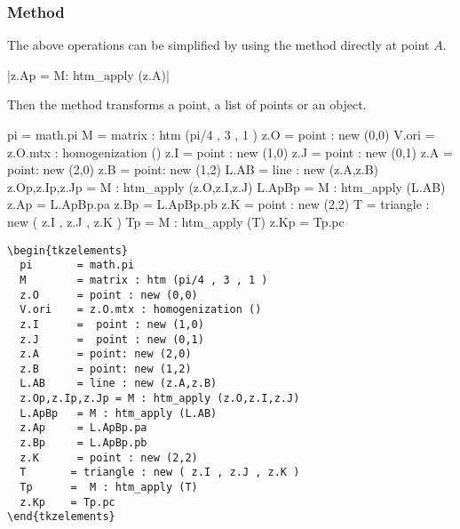 \subsubsection{Method } %
\label{ssub:method_code_htm__apply}
The above operations can be simplified by using the  method directly at point $A$. 

\begin{mybox}
|z.Ap = M: htm_apply (z.A)|\\
\end{mybox}

Then the method  transforms a point, a list of points or an object.

  \begin{tkzelements}
pi       = math.pi
M        = matrix : htm (pi/4 , 3 , 1 )
z.O      = point : new (0,0)
V.ori    = z.O.mtx : homogenization ()
z.I      =  point : new (1,0)
z.J      =  point : new (0,1)
z.A      = point: new (2,0)
z.B      = point: new (1,2)
L.AB     = line : new (z.A,z.B)
z.Op,z.Ip,z.Jp = M : htm_apply (z.O,z.I,z.J)
L.ApBp   = M : htm_apply (L.AB)
z.Ap     = L.ApBp.pa
z.Bp     = L.ApBp.pb
z.K      = point : new (2,2)
T       = triangle : new ( z.I , z.J , z.K )
Tp      =  M : htm_apply (T)
z.Kp    = Tp.pc
\end{tkzelements}

\begin{minipage}{.6\textwidth}
\begin{Verbatim}
\begin{tkzelements}
  pi       = math.pi
  M        = matrix : htm (pi/4 , 3 , 1 )
  z.O      = point : new (0,0)
  V.ori    = z.O.mtx : homogenization ()
  z.I      =  point : new (1,0)
  z.J      =  point : new (0,1)
  z.A      = point: new (2,0)
  z.B      = point: new (1,2)
  L.AB     = line : new (z.A,z.B)
  z.Op,z.Ip,z.Jp = M : htm_apply (z.O,z.I,z.J)
  L.ApBp   = M : htm_apply (L.AB)
  z.Ap     = L.ApBp.pa
  z.Bp     = L.ApBp.pb
  z.K      = point : new (2,2)
  T       = triangle : new ( z.I , z.J , z.K )
  Tp      =  M : htm_apply (T)
  z.Kp    = Tp.pc
\end{tkzelements}
\end{Verbatim}
\end{minipage}
\begin{minipage}{.4\textwidth}
\end{minipage}

